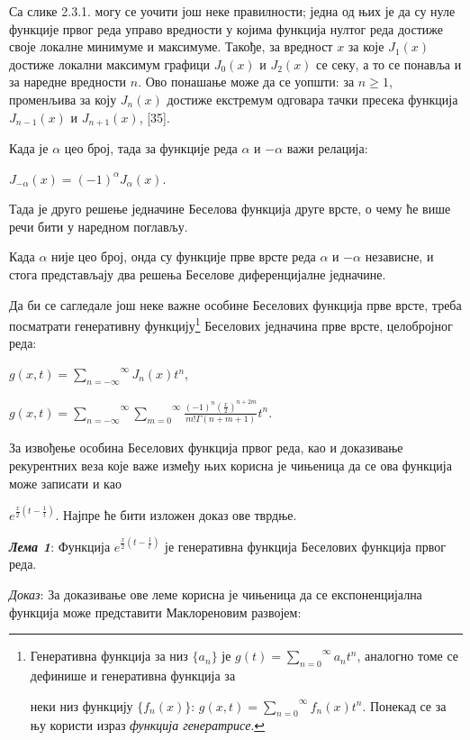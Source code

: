 Са слике 2.3.1. могу се уочити још неке правилности; једна од њих је да
су нуле функције првог реда управо вредности у којима функција нултог
реда достиже своје локалне минимуме и максимуме. Такође, за вредност
\(x\) за које \(J_{1}(x)\) достиже локални максимум графици \(J_{0}(x)\)
и \(J_{2}(x)\) се секу, а то се понавља и за наредне вредности \(n\).
Ово понашање може да се уопшти: за \(n \geq 1\), променљива за коју
\(J_{n}(x)\) достиже екстремум одговара тачки пресека функција
\(J_{n - 1}(x)\) и \(J_{n + 1}(x)\), {[}35{]}.

Када је \(\alpha\) цео број, тада за функције реда \(\alpha\) и
\(- \alpha\) важи релација:

\(J_{- \alpha}(x) = {( - 1)}^{\alpha}J_{\alpha}(x)\).

Тада је друго решење једначине Беселова функција друге врсте, о чему ће
више речи бити у наредном поглављу.

Када \(\alpha\) није цео број, онда су функције прве врсте реда
\(\alpha\) и \(- \alpha\) независне, и стога представљају два решења
Беселове диференцијалне једначине.

Да би се сагледале још неке важне особине Беселових функција прве врсте,
треба посматрати генеративну функцију\footnote{Генеративна функција за
  низ \(\{ a_{n}\}\) је
  \(g(t) = \overset{\infty}{\sum_{n = 0}}a_{n}t^{n}\), аналогно томе се
  дефинише и генеративна функција за

  неки низ функцију \(\{ f_{n}(x)\}\):
  \(g(x,t) = \overset{\infty}{\sum_{n = 0}}f_{n}(x)t^{n}\). Понекад се
  за њу користи израз \emph{функција генератрисе}.} Беселових једначина
прве врсте, целобројног реда:

\(g(x,t) = \overset{\infty}{\sum_{n = - \infty}}J_{n}(x)t^{n}\),

\(g(x,t) = \overset{}{\underset{}{\overset{\infty}{\sum_{n = - \infty}}\overset{\infty}{\sum_{m = 0}}\frac{{( - 1)}^{n}\left( \frac{x}{2} \right)^{n + 2m}}{m!\Gamma(n + m + 1)}}}t^{n}\).

За извођење особина Беселових функција првог реда, као и доказивање
рекурентних веза које важе између њих корисна је чињеница да се ова
функција може записати и као

\(e^{\frac{x}{2}(t - \frac{1}{t})}\). Најпре ће бити изложен доказ ове
тврдње.

\emph{\textbf{Лема 1}}: Функција \(e^{\frac{x}{2}(t - \frac{1}{t})}\) је
генеративна функција Беселових функција првог реда.

\emph{Доказ}: За доказивање ове леме корисна је чињеница да се
експоненцијална функција може представити Маклореновим развојем:

